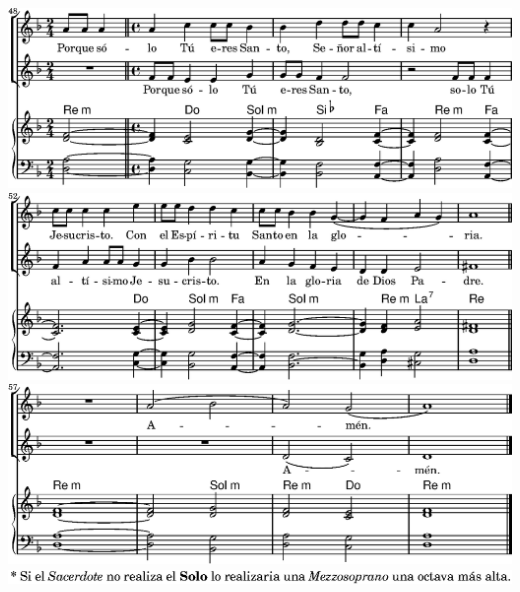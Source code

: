 \fi
\includegraphics{99/lily-924018f8-15}%
\ifx\betweenLilyPondSystem \undefined
  \linebreak
\else
  \expandafter{}%
\fi
\includegraphics{99/lily-924018f8-16}%
\ifx\betweenLilyPondSystem \undefined
  \linebreak
\else
  \expandafter{}%
\fi
\includegraphics{99/lily-924018f8-17}%
\ifx\betweenLilyPondSystem \undefined
  \linebreak
\else
  \expandafter{}%
\fi
\includegraphics{99/lily-924018f8-18}%
